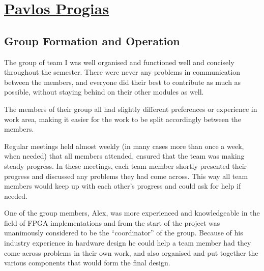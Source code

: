 
\section{\texorpdfstring{\href{mailto:pp5g11@ecs.soton.ac.uk}{Pavlos Progias}} {Pavlos Progias}}

\subsection{Group Formation and Operation}
\label{sec:formation}

%

The group of team I was well organised and functioned well and concisely throughout the semester. There were never any problems in communication between the members, and everyone did their best to contribute as much as possible, without staying behind on their other modules as well.

The members of their group all had slightly different preferences or experience in work area, making it easier for the work to be split accordingly between the members.

Regular meetings held almost weekly (in many cases more than once a week, when needed) that all members attended, ensured that the team was making steady progress. In these meetings, each team member shortly presented their progress and discussed any problems they had come across. This way all team members would keep up with each other's progress and could ask for help if needed.

One of the group members, Alex, was more experienced and knowledgeable in the field of FPGA implementations and from the start of the project was unanimously considered to be the ``coordinator'' of the group. Because of his industry experience in hardware design he could help a team member had they come across problems in their own work, and also organised and put together the various components that would form the final design.

